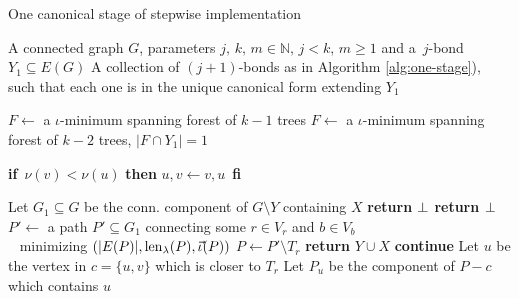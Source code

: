 \begin{algorithm}
	\caption{One canonical stage of stepwise implementation}
	\label{alg:can_one_step}
\begin{algorithmic}[1]
	\Require A connected graph $G$, parameters $j,\, k,\, m \in \mathbb{N},\, j < k,\, m \geq 1$ and a~$j$-bond $Y_1 \subseteq E(G)$
	\Ensure A collection of $(j+1)$-bonds as in Algorithm \ref{alg:one-stage}), such that each one is in the unique canonical form extending $Y_1$

		\State $F \leftarrow$ a $\iota$-minimum spanning forest of $k-1$ trees
		\Else
		\State $F \leftarrow$ a $\iota$-minimum spanning forest of $k-2$ trees, $\lvert F \cap Y_1 \rvert = 1$
	\EndIf

		\State \textbf{if} $ \, \nu(v) < \nu(u)$ \textbf{then}  $u,v \leftarrow v, u \,$ \textbf{fi}
		\State {}
	\EndFor

	\State Let $G_1 \subseteq G$ be the conn. component of $G \setminus Y$ containing $X$
		\State \textbf{return $\perp$}
	\EndIf
		\State \textbf{return $\perp$}
	\EndIf
	\State $P' \leftarrow$ a path $P' \subseteq G_1$ connecting some $r \in V_r$ and $b \in V_b$ \\
	\qquad \quad \,\,\, minimizing $(\lvert E(P) \rvert, \operatorname{len}_\lambda(P), \vec{\iota}(P) )$
	\State $P \leftarrow P' \setminus T_r$
		\State \textbf{return} $Y \cup X$ 
	\Else
				\State \textbf{continue}
			\EndIf
			\State Let $u$ be the vertex in $c = \{u,v\}$ which is closer to $T_r$
			\State Let $P_u$ be the component of $P - c$ which contains $u$
			\State {}
		\EndFor
	\EndIf

	\EndProcedure
\end{algorithmic}
\end{algorithm}

\clearpage


